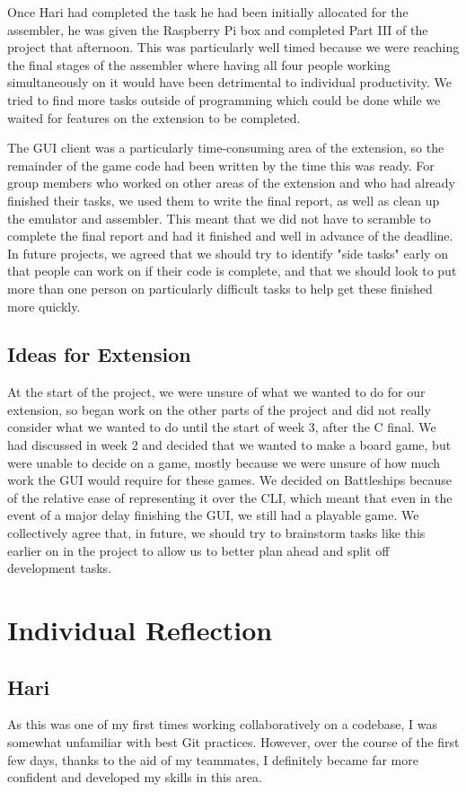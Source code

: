 \documentclass[11pt]{article}
\begin{document}
Once Hari had completed the task he had been initially allocated for the assembler, he was given the Raspberry Pi box and completed Part III of the project that afternoon. This was particularly well timed because we were reaching the final stages of the assembler where having all four people working simultaneously on it would have been detrimental to individual productivity. We tried to find more tasks outside of programming which could be done while we waited for features on the extension to be completed.

The GUI client was a particularly time-consuming area of the extension, so the remainder of the game code had been written by the time this was ready. For group members who worked on other areas of the extension and who had already finished their tasks, we used them to write the final report, as well as clean up the emulator and assembler. This meant that we did not have to scramble to complete the final report and had it finished and well in advance of the deadline. In future projects, we agreed that we should try to identify "side tasks" early on that people can work on if their code is complete, and that we should look to put more than one person on particularly difficult tasks to help get these finished more quickly.
\subsection{Ideas for Extension}

At the start of the project, we were unsure of what we wanted to do for our extension, so began work on the other parts of the project and did not really consider what we wanted to do until the start of week 3, after the C final. We had discussed in week 2 and decided that we wanted to make a board game, but were unable to decide on a game, mostly because we were unsure of how much work the GUI would require for these games. We decided on Battleships because of the relative ease of representing it over the CLI, which meant that even in the event of a major delay finishing the GUI, we still had a playable game. We collectively agree that, in future, we should try to brainstorm tasks like this earlier on in the project to allow us to better plan ahead and split off development tasks.

\section{Individual Reflection}
\noindent
\subsection{Hari}
As this was one of my first times working collaboratively on a codebase, I was somewhat unfamiliar with best Git practices. However, over the course of the first few days, thanks to the aid of my teammates, I definitely became far more confident and developed my skills in this area.
\end{document}
